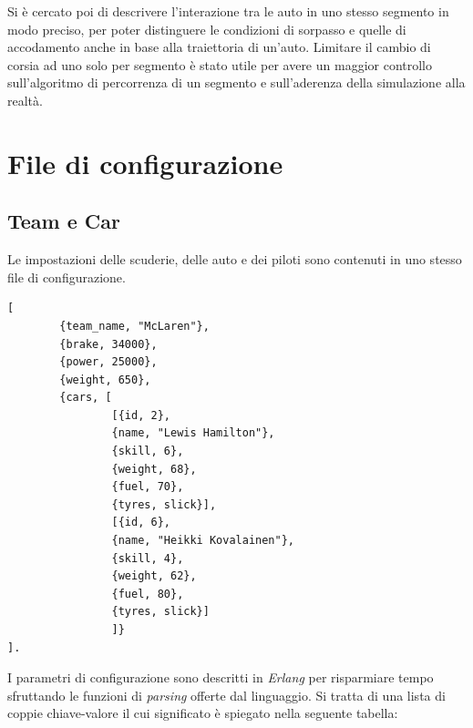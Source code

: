\documentclass[11pt,a4paper]{report}
\newcommand{\Erlang}{\textsl{Erlang}}
\begin{document}
Si è cercato poi di descrivere l'interazione tra le auto in uno stesso segmento in modo preciso, per poter distinguere le condizioni di sorpasso e quelle di accodamento anche in base alla traiettoria di un'auto. Limitare il cambio di corsia ad uno solo per segmento è stato utile per avere un maggior controllo sull'algoritmo di percorrenza di un segmento e sull'aderenza della simulazione alla realtà.


\appendix


\chapter{File di configurazione}
\section*{Team e Car}
Le impostazioni delle scuderie, delle auto e dei piloti sono contenuti in uno stesso file di configurazione.

\begin{lstlisting}
[
        {team_name, "McLaren"},
        {brake, 34000},
        {power, 25000},
        {weight, 650},
        {cars, [
                [{id, 2},
                {name, "Lewis Hamilton"},
                {skill, 6},
                {weight, 68},
                {fuel, 70},
                {tyres, slick}],
                [{id, 6},
                {name, "Heikki Kovalainen"},
                {skill, 4},
                {weight, 62},
                {fuel, 80},
                {tyres, slick}]
                ]}
].
\end{lstlisting}

I parametri di configurazione sono descritti in \Erlang{} per risparmiare tempo sfruttando le funzioni di \textit{parsing} offerte dal linguaggio. Si tratta di una lista di coppie chiave-valore il cui significato è spiegato nella seguente tabella:
\end{document}
